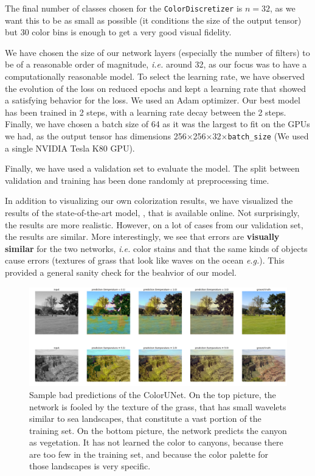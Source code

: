 \documentclass[10pt,twocolumn,letterpaper]{article}
\begin{document}
The final number of classes chosen for the \texttt{ColorDiscretizer} is $n=32$, as we want this to be as small as possible (it conditions the size of the output tensor) but 30 color bins is enough to get a very good visual fidelity.

We have chosen the size of our network layers (especially the number of filters) to be of a reasonable order of magnitude, \textit{i.e.} around 32, as our focus was to have a computationally reasonable model. To select the learning rate, we have observed the evolution of the loss on reduced epochs and kept a learning rate that showed a satisfying behavior for the loss. We used an Adam optimizer. Our best model has been trained in 2 steps, with a learning rate decay between the 2 steps. Finally, we have chosen a batch size of 64 as it was the largest to fit on the GPUs we had, as the output tensor has dimensions 256$\times$256$\times$32$\times$\texttt{batch\_size} (We used a single NVIDIA Tesla K80 GPU).

Finally, we have used a validation set to evaluate the model. The split between validation and training  has been done randomly at preprocessing time.

In addition to visualizing our own colorization results, we have visualized the results of the state-of-the-art model, \cite{zhang2016colorful}, that is available online. Not surprisingly, the results are more realistic. However, on a lot of cases from our validation set, the results are similar. More interestingly, we see that errors are \textbf{visually similar} for the two networks, \textit{i.e.} color stains and that the same kinds of objects cause errors (textures of grass that look like waves on the ocean \textit{e.g.}). This provided a general sanity check for the beahvior of our model. 
\begin{figure}
\begin{center}
\includegraphics[width=450px]{worse}
\caption{Sample bad predictions of the ColorUNet. On the top picture, the network is fooled by the texture of the grass, that has small wavelets similar to sea landscapes, that constitute a vast portion of the training set. On the bottom picture, the network predicts the canyon as vegetation. It has not learned the color to canyons, because there are too few in the training set, and because the color palette for those landscapes is very specific.}
\label{worse}
\end{center}
\end{figure}
\end{document}

